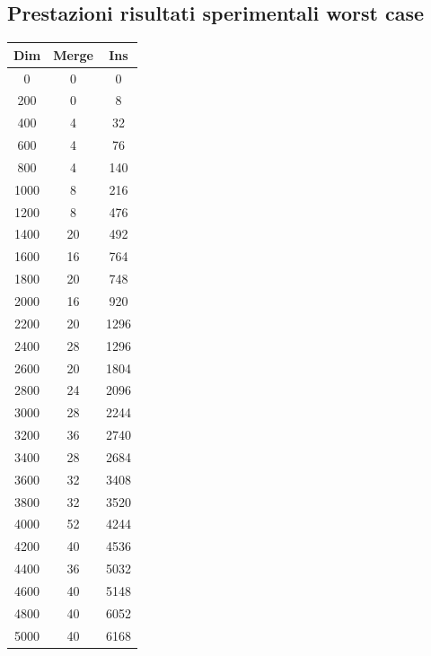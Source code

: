 \documentclass[12pt]{article}
\begin{document}
\subsection{Prestazioni risultati sperimentali worst case}
\begin{center}
 \begin{tabular}{||c  c c||} 
 \hline
 Dim & Merge & Ins \\ [0.5ex] 
 \hline\hline
 \hline
0 & 0 & 0 \\
\hline
200 & 0 & 8 \\
\hline
400 & 4 & 32 \\
\hline
600 & 4 & 76 \\
\hline
800 & 4 & 140 \\
\hline
1000 & 8 & 216 \\
\hline
1200 & 8 & 476 \\
\hline
1400 & 20 & 492 \\
\hline
1600 & 16 & 764 \\
\hline
1800 & 20 & 748 \\
\hline
2000 & 16 & 920 \\
\hline
2200 & 20 & 1296 \\
\hline
2400 & 28 & 1296 \\
\hline
2600 & 20 & 1804 \\
\hline
2800 & 24 & 2096 \\
\hline
3000 & 28 & 2244 \\
\hline
3200 & 36 & 2740 \\
\hline
3400 & 28 & 2684 \\
\hline
3600 & 32 & 3408 \\
\hline
3800 & 32 & 3520 \\
\hline
4000 & 52 & 4244 \\
\hline
4200 & 40 & 4536 \\
\hline
4400 & 36 & 5032 \\
\hline
4600 & 40 & 5148 \\
\hline
4800 & 40 & 6052 \\
\hline
5000 & 40 & 6168 \\ 
 \hline
\end{tabular}
\end{center}
\end{document}
